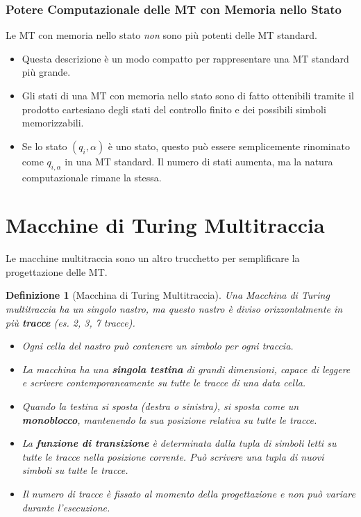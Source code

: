 \documentclass[a4paper]{article}
\newtheorem{definition}{Definizione}
\begin{document}
\subsubsection{Potere Computazionale delle MT con Memoria nello Stato}
Le MT con memoria nello stato \emph{non} sono più potenti delle MT standard.
\begin{itemize}
    \item Questa descrizione è un modo compatto per rappresentare una MT standard più grande.
    \item Gli stati di una MT con memoria nello stato sono di fatto ottenibili tramite il prodotto cartesiano degli stati del controllo finito e dei possibili simboli memorizzabili.
    \item Se lo stato $(q_i, \alpha)$ è uno stato, questo può essere semplicemente rinominato come $q_{i,\alpha}$ in una MT standard. Il numero di stati aumenta, ma la natura computazionale rimane la stessa.
\end{itemize}

\section{Macchine di Turing Multitraccia}
Le macchine multitraccia sono un altro trucchetto per semplificare la progettazione delle MT.

\begin{definition}[Macchina di Turing Multitraccia]
Una Macchina di Turing multitraccia ha un singolo nastro, ma questo nastro è diviso orizzontalmente in più \textbf{tracce} (es. 2, 3, 7 tracce).
\begin{itemize}
    \item Ogni cella del nastro può contenere un simbolo per ogni traccia.
    \item La macchina ha una \textbf{singola testina} di grandi dimensioni, capace di leggere e scrivere contemporaneamente su tutte le tracce di una data cella.
    \item Quando la testina si sposta (destra o sinistra), si sposta come un \textbf{monoblocco}, mantenendo la sua posizione relativa su tutte le tracce.
    \item La \textbf{funzione di transizione} è determinata dalla tupla di simboli letti su tutte le tracce nella posizione corrente. Può scrivere una tupla di nuovi simboli su tutte le tracce.
    \item Il numero di tracce è fissato al momento della progettazione e non può variare durante l'esecuzione.
\end{itemize}
\end{definition}
\end{document}

